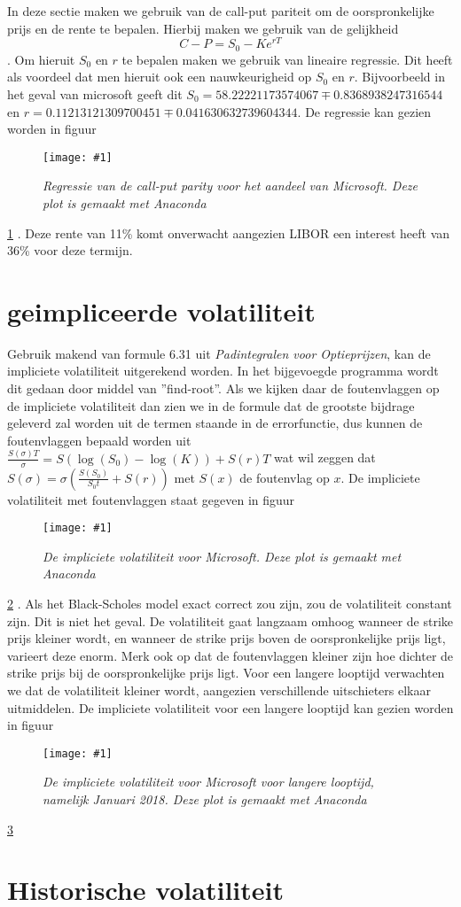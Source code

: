 \documentclass[%
 aip,
 jmp,%
 amsmath,amssymb,
 reprint,%
]{revtex4-1}
\newcommand{\quickfigure}[2]{
\begin{figure}[t]
\texttt{[image: \#1]}
\caption{\textit{#2 Deze plot is gemaakt met Anaconda\citep{anaconda}}\label{fig:#1}}
\end{figure}
\ref{fig:#1}
}
\begin{document}
In deze sectie maken we gebruik van de call-put pariteit om de oorspronkelijke prijs en de rente te bepalen. Hierbij maken we gebruik van de gelijkheid $$C-P = S_0 - K e^{rT}$$. Om hieruit $S_0$ en $r$ te bepalen maken we gebruik van lineaire regressie. Dit heeft als voordeel dat men hieruit ook een nauwkeurigheid op $S_0$ en $r$. Bijvoorbeeld in het geval van microsoft geeft dit $S_0 = 58.22221173574067 \mp 0.8368938247316544$ en  $r = 0.11213121309700451 \mp 0.041630632739604344$. De regressie kan gezien worden in figuur \quickfigure{call-put_parity_MSFT_2017-04-21.png}{Regressie van de call-put parity voor het aandeel van Microsoft.}. Deze rente van 11\% komt onverwacht aangezien LIBOR\cite{global} een interest heeft van 36\% voor deze termijn. 

\section{geimpliceerde volatiliteit}

Gebruik makend van formule 6.31 uit \textit{Padintegralen voor Optieprijzen}\citep{cursus}, kan de impliciete volatiliteit uitgerekend worden. In het bijgevoegde programma wordt dit gedaan door middel van ''find-root''. Als we kijken daar de foutenvlaggen op de impliciete volatiliteit dan zien we in de formule dat de grootste bijdrage geleverd zal worden uit de termen staande in de errorfunctie, dus kunnen de foutenvlaggen bepaald worden uit $\frac{S(\sigma)T}{\sigma} = S(\log(S_0) - \log(K)) + S(r)T$ wat wil zeggen dat $S(\sigma) = \sigma\left(\frac{S(S_0)}{S_0 t} + S(r)\right)$ met $S(x)$ de foutenvlag op $x$. De impliciete volatiliteit met foutenvlaggen staat gegeven in figuur \quickfigure{impl_vol_MSFT_2017-04-21.png}{De impliciete volatiliteit voor Microsoft.}. Als het Black-Scholes model exact correct zou zijn, zou de volatiliteit constant zijn. Dit is niet het geval. De volatiliteit gaat langzaam omhoog wanneer de strike prijs kleiner wordt, en wanneer de strike prijs boven de oorspronkelijke prijs ligt, varieert deze enorm. Merk ook op dat de foutenvlaggen kleiner zijn hoe dichter de strike prijs bij de oorspronkelijke prijs ligt. Voor een langere looptijd verwachten we dat de volatiliteit kleiner wordt, aangezien verschillende uitschieters elkaar uitmiddelen. De impliciete volatiliteit voor een langere looptijd kan gezien worden in figuur \quickfigure{impl_vol_MSFT_2018-01-19.png}{De impliciete volatiliteit voor Microsoft voor langere looptijd, namelijk Januari 2018.}

\section{Historische volatiliteit}


\nocite{sjab}



\end{document}

